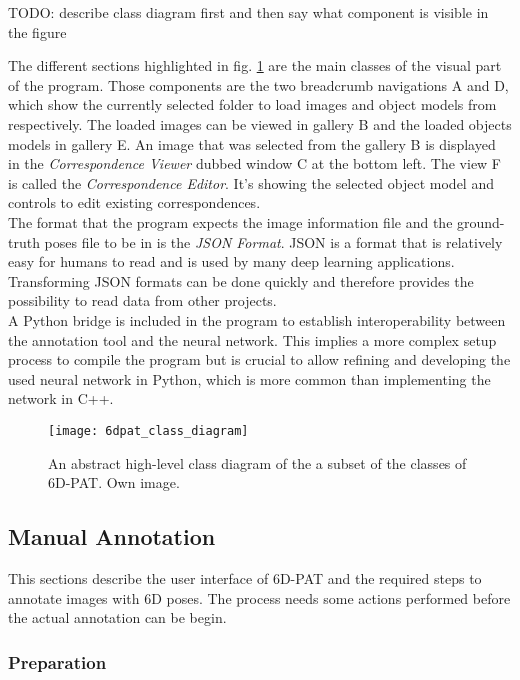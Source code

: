TODO: describe class diagram first and then say what component is visible in the figure

The different sections highlighted in fig. \ref{fig:6dpat_components} are the main classes of the visual part of the program. Those components are the two breadcrumb navigations A and D, which show the currently selected folder to load images and object models from respectively. The loaded images can be viewed in gallery B and the loaded objects models in gallery E. An image that was selected from the gallery B is displayed in the \textit{Correspondence Viewer} dubbed window C at the bottom left. The view F is called the \textit{Correspondence Editor}. It's showing the selected object model and controls to edit existing correspondences. \\

The format that the program expects the image information file and the ground-truth poses file to be in is the \textit{JSON Format}. JSON is a format that is relatively easy for humans to read and is used by many deep learning applications. Transforming JSON formats can be done quickly and therefore provides the possibility to read data from other projects. \\

A Python bridge is included in the program to establish interoperability between the annotation tool and the neural network. This implies a more complex setup process to compile the program but is crucial to allow refining and developing the used neural network in Python, which is more common than implementing the network in C++. 

\begin{figure}[!tbp]
	\centering
    \texttt{[image: 6dpat\_class\_diagram]}
    \caption{An abstract high-level class diagram of the a subset of the classes of 6D-PAT. Own image.}
    \label{fig:6dpat_components}
\end{figure} 

\subsection{Manual Annotation} 

This sections describe the user interface of 6D-PAT and the required steps to annotate images with 6D poses. The process needs some actions performed before the actual annotation can be begin. 

\subsubsection{Preparation}

